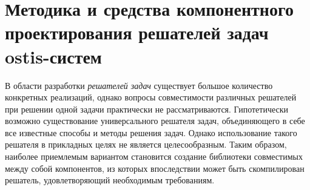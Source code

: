 \chapter{Методика и средства компонентного проектирования решателей задач ostis-систем}
\label{chapter_ps_design}


В области разработки \textit{решателей задач} существует большое количество конкретных реализаций, однако вопросы совместимости различных решателей при решении одной задачи практически не рассматриваются. Гипотетически возможно существование универсального решателя задач, объединяющего в себе все известные способы и методы решения задач. Однако использование такого решателя в прикладных целях не является целесообразным. Таким образом, наиболее приемлемым вариантом становится создание библиотеки совместимых между собой компонентов, из которых впоследствии может быть скомпилирован решатель, удовлетворяющий необходимым требованиям.





